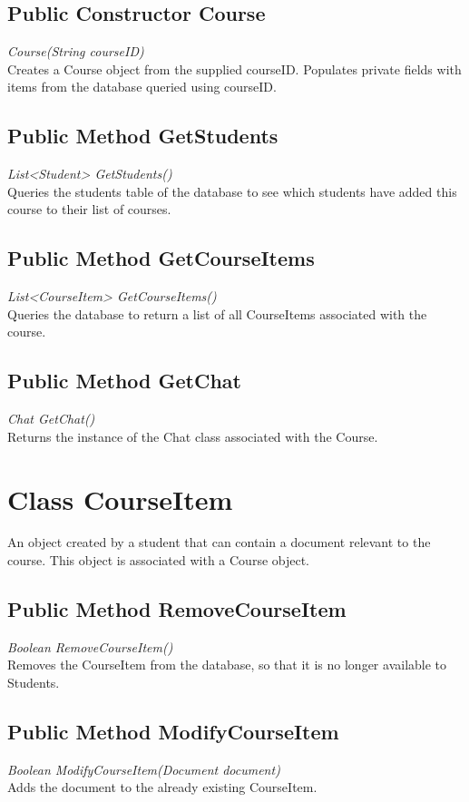 \documentclass[16pt]{scrreprt}
\begin{document}
\subsection{Public Constructor Course}
\textit{Course(String courseID)} \\
Creates a Course object from the supplied courseID. Populates private fields with items from the database queried using courseID.

\subsection{Public Method GetStudents}
\textit{List<Student> GetStudents()} \\
Queries the students table of the database to see which students have added this course to their list of courses.

\subsection{Public Method GetCourseItems}
\textit{List<CourseItem> GetCourseItems()} \\
Queries the database to return a list of all CourseItems associated with the course.

\subsection{Public Method GetChat}
\textit{Chat GetChat()} \\
Returns the instance of the Chat class associated with the Course.

\section{Class CourseItem}
An object created by a student that can contain a document relevant to the course. This object is associated with a Course object.

\subsection{Public Method RemoveCourseItem}
\textit{Boolean RemoveCourseItem()} \\
Removes the CourseItem from the database, so that it is no longer available to Students.

\subsection{Public Method ModifyCourseItem}
\textit{Boolean ModifyCourseItem(Document document)} \\
Adds the document to the already existing CourseItem.
\end{document}
